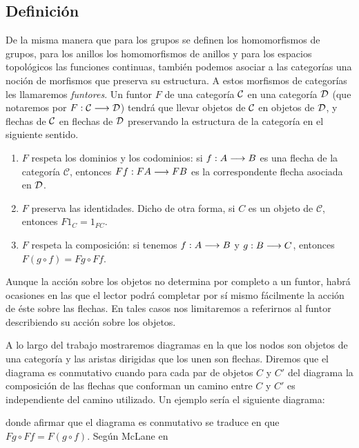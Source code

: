 \subsection{Definición}
De la misma manera que para los grupos se definen los homomorfismos
de grupos, para los anillos los homomorfismos de anillos y para los
espacios topológicos las funciones continuas, también
podemos asociar a las categorías una noción de morfismos que preserva
su estructura. A estos morfismos de categorías les llamaremos
\emph{funtores}. Un funtor $F$ de una categoría
$\mathcal{C}$ en una categoría $\mathcal{D}$ (que notaremos por $F : \mathcal{C}\longrightarrow \mathcal{D}$)
tendrá que llevar objetos de $\mathcal{C}$ en objetos de $\mathcal{D}$, y flechas
de $\mathcal{C}$ en flechas de $\mathcal{D}$ preservando la estructura de la
categoría en el siguiente sentido.
\begin{enumerate}
\item $F$ respeta los dominios y los codominios:
si $f : A\longrightarrow B$ es una flecha
de la categoría $\mathcal{C}$, entonces
$F f : F A\longrightarrow F B$ es la correspondente flecha asociada
en $\mathcal{D}$.
\item $F$ preserva las identidades. Dicho de otra forma, si $C$ es un
objeto de $\mathcal{C}$, entonces $F 1_C = 1_{F C}$.
\item $F$ respeta la composición: si tenemos $f: A\longrightarrow B$ y
$g : B\longrightarrow C$, entonces $F (g\circ f) = F g \circ F f$.
\end{enumerate}

Aunque la acción sobre los objetos
no determina por completo a un funtor, habrá ocasiones en las que
el lector podrá completar por sí mismo fácilmente la acción de éste
sobre las flechas. En tales casos nos limitaremos a referirnos
al funtor describiendo su acción sobre los objetos.

A lo largo del trabajo mostraremos diagramas en la que los nodos
son objetos de una categoría y las aristas dirigidas
que los unen son flechas.
Diremos que el diagrama es conmutativo cuando para cada par
de objetos $C$ y $C'$ del diagrama la composición
de las flechas que conforman un camino entre $C$ y $C'$ es independiente
del camino utilizado. Un ejemplo sería el siguiente diagrama:
\begin{center}
\end{center}
donde afirmar que el diagrama es conmutativo se traduce en
que $F g \circ F f = F (g\circ f)$. Según McLane en \cite{mclane}

